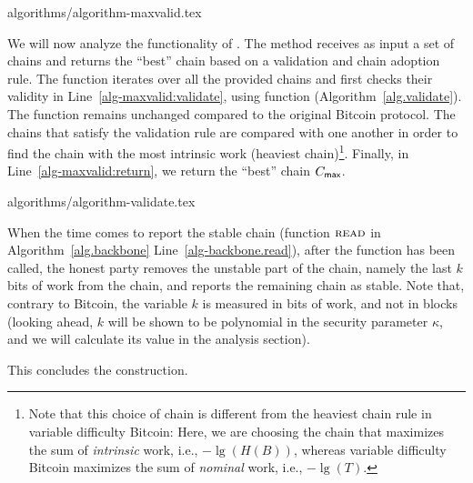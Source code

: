 {algorithms/algorithm-maxvalid.tex}

We will now analyze the functionality of \maxvalid. The method receives as input
a set of chains and returns the ``best'' chain based on a validation and
chain adoption rule. The function iterates over all the provided chains
and first checks their validity in Line~\ref{alg-maxvalid:validate}, using
function \validate (Algorithm~\ref{alg.validate}). The \validate function remains unchanged compared to
the original Bitcoin protocol.
The chains that satisfy the validation rule
are compared with one another in order to find the chain
with the most intrinsic work (heaviest chain)\footnote{%
Note that this choice of chain is different from the heaviest chain rule
in variable difficulty Bitcoin: Here, we are choosing the chain
that maximizes the sum of \emph{intrinsic} work, i.e., $-\lg(H(B))$,
whereas variable difficulty Bitcoin maximizes the sum of
\emph{nominal} work, i.e., $-\lg(T)$.}.
Finally, in Line~\ref{alg-maxvalid:return}, we return the
``best'' chain $C_{\textsf{max}}$.

{algorithms/algorithm-validate.tex}

When the time comes to report the stable chain
(function $\textsc{read}$ in Algorithm~\ref{alg.backbone} Line~\ref{alg-backbone.read}),
after the function \execute has been called,
the honest party removes the unstable part of the chain, namely
the last $k$ bits of work from the chain, and reports
the remaining chain as stable. Note that, contrary to Bitcoin,
the variable $k$ is measured in bits of work, and not in blocks
(looking ahead, $k$ will be shown to be polynomial in the
security parameter $\kappa$, and we will calculate its value
in the analysis section).

This concludes the \poem construction.


